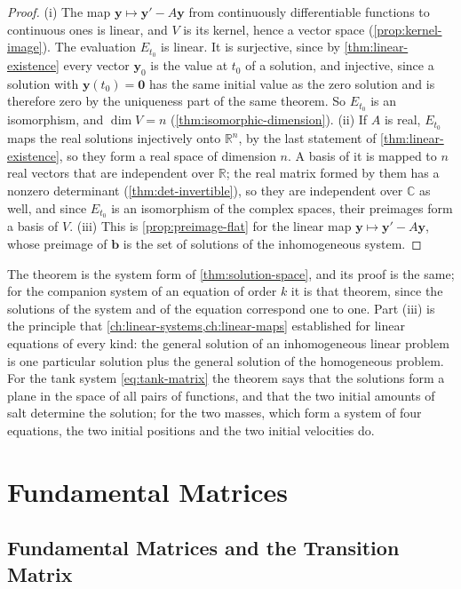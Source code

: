 \begin{proof}
(i) The map $\mathbf y\mapsto\mathbf y'-A\mathbf y$ from continuously differentiable functions to continuous ones is linear, and $V$ is its kernel, hence a vector space (\cref{prop:kernel-image}). The evaluation $E_{t_0}$ is linear. It is surjective, since by \cref{thm:linear-existence} every vector $\mathbf y_0$ is the value at $t_0$ of a solution, and injective, since a solution with $\mathbf y(t_0)=\mathbf 0$ has the same initial value as the zero solution and is therefore zero by the uniqueness part of the same theorem. So $E_{t_0}$ is an isomorphism, and $\dim V=n$ (\cref{thm:isomorphic-dimension}). (ii) If $A$ is real, $E_{t_0}$ maps the real solutions injectively onto $\mathbb R^n$, by the last statement of \cref{thm:linear-existence}, so they form a real space of dimension $n$. A basis of it is mapped to $n$ real vectors that are independent over $\mathbb R$; the real matrix formed by them has a nonzero determinant (\cref{thm:det-invertible}), so they are independent over $\mathbb C$ as well, and since $E_{t_0}$ is an isomorphism of the complex spaces, their preimages form a basis of $V$. (iii) This is \cref{prop:preimage-flat} for the linear map $\mathbf y\mapsto\mathbf y'-A\mathbf y$, whose preimage of $\mathbf b$ is the set of solutions of the inhomogeneous system.
\end{proof}

The theorem is the system form of \cref{thm:solution-space}, and its proof is the same; for the companion system of an equation of order $k$ it is that theorem, since the solutions of the system and of the equation correspond one to one. Part (iii) is the principle that \cref{ch:linear-systems,ch:linear-maps} established for linear equations of every kind: the general solution of an inhomogeneous linear problem is one particular solution plus the general solution of the homogeneous problem. For the tank system \eqref{eq:tank-matrix} the theorem says that the solutions form a plane in the space of all pairs of functions, and that the two initial amounts of salt determine the solution; for the two masses, which form a system of four equations, the two initial positions and the two initial velocities do.

\section{Fundamental Matrices}
\label{sec:fundamental-matrices}

\subsection{Fundamental Matrices and the Transition Matrix}

